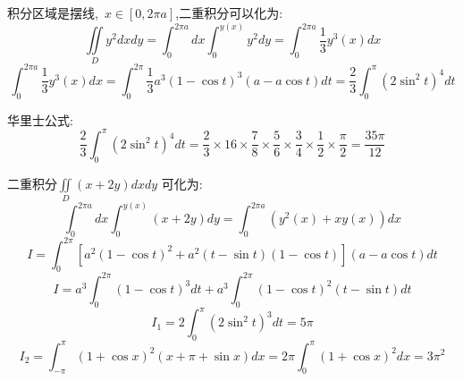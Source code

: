 \begin{solution}
	
	积分区域是摆线,\ $x\in [0,2\pi a]$,二重积分可以化为: 
	$$\iint\limits_{D}y^2dxdy=\int_{0}^{2\pi a}dx\int_{0}^{y(x)}y^2dy=\int_{0}^{2\pi a}\frac{1}{3}y^{3}(x)dx$$
	$$\int_{0}^{2\pi a}\frac{1}{3}y^{3}(x)dx=\int_{0}^{2\pi }\frac{1}{3}a^3(1-\cos t)^3(a-a\cos t)dt=\frac{2}{3}\int_{0}^{\pi}(2\sin^2 t)^4dt$$
	
	华里士公式:  $$\frac{2}{3}\int_{0}^{\pi}(2\sin^2 t)^4dt=\frac{2}{3}\times 16\times\frac{7}{8}\times\frac{5}{6}\times\frac{3}{4}\times\frac{1}{2}\times\frac{\pi}{2}=\frac{35\pi}{12}$$
	
	二重积分$\iint\limits_{D}(x+2y)dxdy$ 可化为: 
	$$\int_{0}^{2\pi a}dx\int_{0}^{y(x)}(x+2y)dy=\int_{0}^{2\pi a}(y^{2}(x)+xy(x))dx$$
	$$I=\int_{0}^{2\pi }[a^2(1-\cos t)^2+a^2(t-\sin t)(1-\cos t)](a-a\cos t)dt$$
	$$I=a^3\int_{0}^{2\pi }(1-\cos t)^3dt+a^3\int_{0}^{2\pi }(1-\cos t)^2(t-\sin t)dt$$
	$$I_{1}=2\int_{0}^{\pi}(2\sin^2 t)^3dt=5\pi$$
	$$I_{2}=\int_{-\pi}^{\pi}(1+\cos x)^2(x+\pi+\sin x)dx=2\pi\int_{0}^{\pi}(1+\cos x)^2dx=3\pi^2$$
\end{solution}


